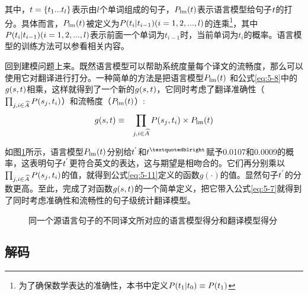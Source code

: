 \noindent  其中，${t}=\{ t_1...t_l \}$表示由$l$个单词组成的句子，${P}_{\textrm{lm}}({t})$表示语言模型给句子${t}$的打分。具体而言，${P}_{\textrm{lm}}({t})$被定义为${P}(t_i|t_{i-1})(i=1,2,...,l)$的连乘\footnote{为了确保数学表达的准确性，本书中定义${P}(t_1|t_0) \equiv {P}(t_1)$}，其中${P}(t_i|t_{i-1})(i=1,2,...,l)$表示前面一个单词为$t_{i-1}$时，当前单词为$t_i$的概率。语言模型的训练方法可以参看{\chaptertwo}相关内容。

\parinterval 回到建模问题上来。既然语言模型可以帮助系统度量每个译文的流畅度，那么可以使用它对翻译进行打分。一种简单的方法是把语言模型${P}_{\textrm{lm}}{({t})}$ 和公式\eqref{eq:5-8}中的$g({s},{t})$相乘，这样就得到了一个新的$g({s},{t})$，它同时考虑了翻译准确性（$\prod_{j,i \in \widehat{A}}{{P}(s_j,t_i)}$）和流畅度（${P}_{\textrm{lm}}({t})$）:
\begin{eqnarray}
g({s},{t}) & \equiv & \prod_{j,i \in \widehat{A}}{{P}(s_j,t_i)} \times  {P}_{\textrm{lm}}({t})
\label{eq:5-11}
\end{eqnarray}

\parinterval 如图\ref{fig:5-9}所示，语言模型${P}_{\textrm{lm}}({t})$分别给${t}^{'}$和$\seq{t}^{”}$赋予0.0107和0.0009的概率，这表明句子${t}^{'}$更符合英文的表达，这与期望是相吻合的。它们再分别乘以$\prod_{j,i \in \widehat{A}}{{P}(s_j},t_i)$的值，就得到公式\eqref{eq:5-11}定义的函数$g(\cdot)$的值。显然句子${t}^{'}$的分数更高。至此，完成了对函数$g({s},{t})$的一个简单定义，把它带入公式\eqref{eq:5-7}就得到了同时考虑准确性和流畅性的句子级统计翻译模型。

\begin{figure}[htp]
    \centering

    \caption{同一个源语言句子的不同译文所对应的语言模型得分和翻译模型得分}
    \label{fig:5-9}
\end{figure}



\subsection{解码}
\label{sec:simple-decoding}

